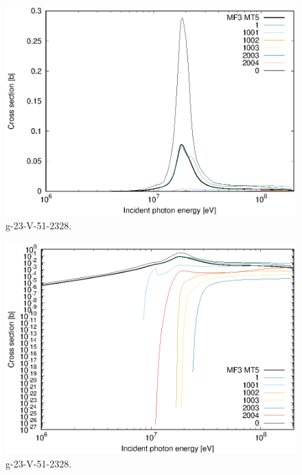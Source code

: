 \begin{figure}
 \includegraphics[width=\linewidth]{eps/g_23-V-51_2328.eps}
  \caption{g-23-V-51-2328.}
\end{figure}
\begin{figure}
 \includegraphics[width=\linewidth]{eps-log/g_23-V-51_2328.eps}
 \caption{g-23-V-51-2328.}
\end{figure}
\newpage \clearpage

